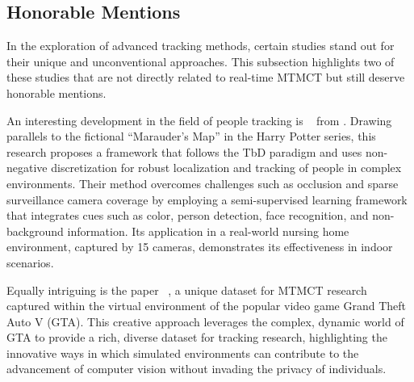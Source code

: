 \subsection{Honorable Mentions}\label{subsec:honorable_mentions}
In the exploration of advanced tracking methods, certain studies stand out for their unique and unconventional approaches. This subsection highlights two of these studies that are not directly related to real-time MTMCT but still deserve honorable mentions.

An interesting development in the field of people tracking is ~\cite{Yu13} from \citeyear{Yu13}. Drawing parallels to the fictional ``Marauder's Map'' in the Harry Potter series, this research proposes a framework that follows the TbD paradigm and uses non-negative discretization for robust localization and tracking of people in complex environments. Their method overcomes challenges such as occlusion and sparse surveillance camera coverage by employing a semi-supervised learning framework that integrates cues such as color, person detection, face recognition, and non-background information. Its application in a real-world nursing home environment, captured by 15 cameras, demonstrates its effectiveness in indoor scenarios.

Equally intriguing is the paper ~\cite{Koehl20}, a unique dataset for MTMCT research captured within the virtual environment of the popular video game Grand Theft Auto V (GTA). This creative approach leverages the complex, dynamic world of GTA to provide a rich, diverse dataset for tracking research, highlighting the innovative ways in which simulated environments can contribute to the advancement of computer vision without invading the privacy of individuals.